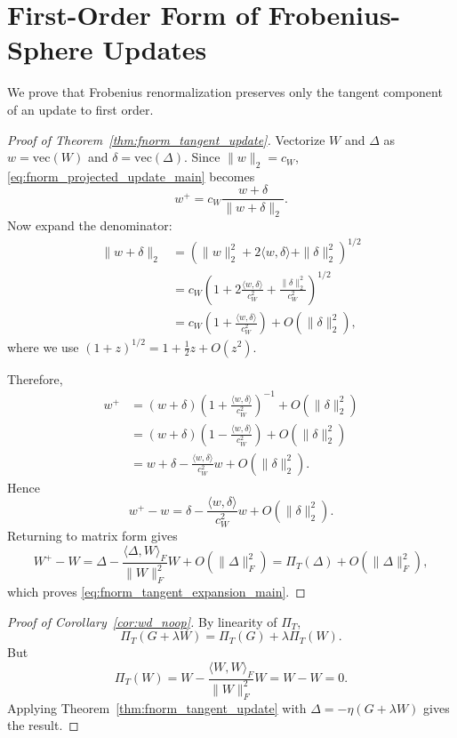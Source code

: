 \documentclass{article}
\begin{document}
\section{First-Order Form of Frobenius-Sphere Updates}
\label{app:proof_fnorm_tangent_update}

We prove that Frobenius renormalization preserves only the tangent component of an update to first order.

\begin{proof}[Proof of Theorem~\ref{thm:fnorm_tangent_update}]
Vectorize $W$ and $\Delta$ as $w=\mathrm{vec}(W)$ and $\delta=\mathrm{vec}(\Delta)$. Since $\|w\|_2=c_W$, \eqref{eq:fnorm_projected_update_main} becomes
\begin{equation}
w^{+}
=
c_W \frac{w+\delta}{\|w+\delta\|_2}.
\end{equation}
Now expand the denominator:
\begin{align}
\|w+\delta\|_2
&=
\left(\|w\|_2^2 + 2\langle w,\delta\rangle + \|\delta\|_2^2\right)^{1/2} \\
&=
c_W
\left(
1 + 2\frac{\langle w,\delta\rangle}{c_W^2} + \frac{\|\delta\|_2^2}{c_W^2}
\right)^{1/2} \\
&=
c_W
\left(
1 + \frac{\langle w,\delta\rangle}{c_W^2}
\right)
+
O(\|\delta\|_2^2),
\end{align}
where we use $(1+z)^{1/2}=1+\frac12 z + O(z^2)$.

Therefore,
\begin{align}
w^{+}
&=
(w+\delta)
\left(
1 + \frac{\langle w,\delta\rangle}{c_W^2}
\right)^{-1}
+
O(\|\delta\|_2^2) \\
&=
(w+\delta)
\left(
1 - \frac{\langle w,\delta\rangle}{c_W^2}
\right)
+
O(\|\delta\|_2^2) \\
&=
w
+
\delta
-
\frac{\langle w,\delta\rangle}{c_W^2}w
+
O(\|\delta\|_2^2).
\end{align}
Hence
\begin{equation}
w^{+}-w
=
\delta
-
\frac{\langle w,\delta\rangle}{c_W^2}w
+
O(\|\delta\|_2^2).
\end{equation}
Returning to matrix form gives
\begin{equation}
W^{+}-W
=
\Delta
-
\frac{\langle \Delta,W\rangle_F}{\|W\|_F^2}W
+
O(\|\Delta\|_F^2)
=
\Pi_T(\Delta)+O(\|\Delta\|_F^2),
\end{equation}
which proves \eqref{eq:fnorm_tangent_expansion_main}.
\end{proof}

\begin{proof}[Proof of Corollary~\ref{cor:wd_noop}]
By linearity of $\Pi_T$,
\begin{equation}
\Pi_T(G+\lambda W)=\Pi_T(G)+\lambda \Pi_T(W).
\end{equation}
But
\begin{equation}
\Pi_T(W)
=
W-\frac{\langle W,W\rangle_F}{\|W\|_F^2}W
=
W-W=0.
\end{equation}
Applying Theorem~\ref{thm:fnorm_tangent_update} with $\Delta=-\eta(G+\lambda W)$ gives the result.
\end{proof}
\end{document}
